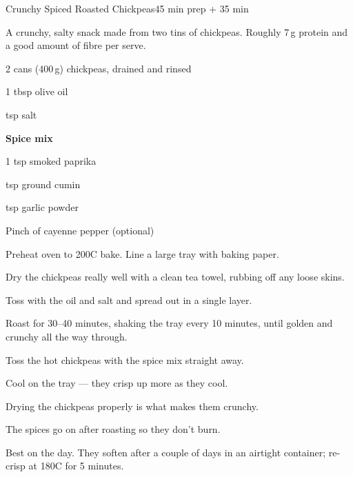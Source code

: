 \begin{recipebox}{Crunchy Spiced Roasted Chickpeas}{4}{5 min prep + 35 min}

A crunchy, salty snack made from two tins of chickpeas. Roughly 7\,g protein
and a good amount of fibre per serve.

\begin{ingredients}
  \item 2 cans (400\,g) chickpeas, drained and rinsed
  \item 1 tbsp olive oil
  \item {} tsp salt
  \item[] \textbf{Spice mix}
  \item 1 tsp smoked paprika
  \item {} tsp ground cumin
  \item {} tsp garlic powder
  \item Pinch of cayenne pepper (optional)
\end{ingredients}

\begin{method}
  \item Preheat oven to 200\degree C bake. Line a large tray with baking paper.
  \item Dry the chickpeas really well with a clean tea towel, rubbing off any loose skins.
  \item Toss with the oil and salt and spread out in a single layer.
  \item Roast for 30--40 minutes, shaking the tray every 10 minutes, until golden and crunchy all the way through.
  \item Toss the hot chickpeas with the spice mix straight away.
  \item Cool on the tray --- they crisp up more as they cool.
\end{method}

\begin{notelist}
  \item Drying the chickpeas properly is what makes them crunchy.
  \item The spices go on after roasting so they don't burn.
  \item Best on the day. They soften after a couple of days in an airtight container; re-crisp at 180\degree C for 5 minutes.
\end{notelist}

\end{recipebox}
